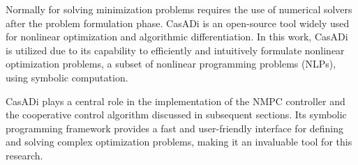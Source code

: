 Normally for solving minimization problems requires the use of numerical solvers after the problem formulation phase. CasADi \cite{Andersson2019} is an open-source tool widely used for nonlinear optimization and algorithmic differentiation. In this work, CasADi is utilized due to its capability to efficiently and intuitively formulate nonlinear optimization problems, a subset of nonlinear programming problems (NLPs), using symbolic computation.

CasADi plays a central role in the implementation of the NMPC controller and the cooperative control algorithm discussed in subsequent sections. Its symbolic programming framework provides a fast and user-friendly interface for defining and solving complex optimization problems, making it an invaluable tool for this research.
